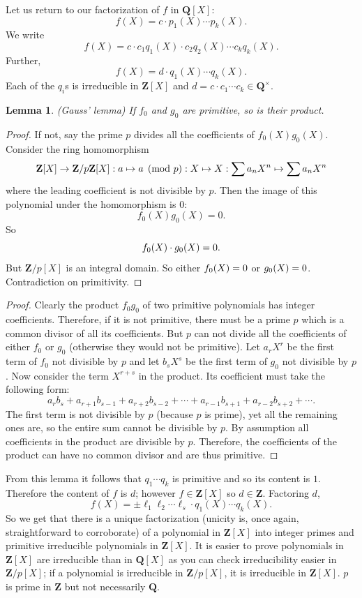 \documentclass[11pt, oneside]{amsart}
\numberwithin{equation}{section}
\numberwithin{theorem}{section}
\newtheorem{lemma}[theorem]{Lemma}
\theoremstyle{definition}
\let\bar\relax
\def\Z{\mathbf{Z}}
\def\Q{\mathbf{Q}}
\begin{document}
{Let us return to our factorization of $f$ in $\Q[X]$:
$$
f(X) = c\cdot p_1(X)\cdots p_k(X).
$$
We write 
$$
f(X) = c\cdot c_1q_1(X) \cdot c_2q_2(X)\cdots c_kq_k(X).
$$
Further,
$$
f(X) = d\cdot q_1(X)\cdots q_k(X).
$$
Each of the $q_i$s is irreducible in $\Z[X]$ and $d = c\cdot c_1\cdots c_k\in\Q^\times$.
\begin{lemma}
(Gauss' lemma) If $f_0$ and $g_0$ are primitive, so is their product.
\end{lemma}
\begin{proof}
If not, say the prime $p$ divides all the coefficients of $f_0(X)g_0(X)$. Consider the ring homomorphism
$$
\Z[X] \to \Z/p\Z[X] : a\mapsto a \pmod p : X\mapsto X : \sum a_nX^n \mapsto \sum \bar{ a_n} X^n
$$
where the leading coefficient is not divisible by $p$. Then the image of this polynomial under the homomorphism is $0$:
$$
f_0(X)g_0(X) = 0.
$$
So
$$
\bar{f_0(X)}\cdot\bar{g_0(X)} = 0.
$$
But $\Z/p[X]$ is an integral domain. So either $\bar{f_0(X)} = 0$ or $\bar{g_0(X)}=0$. Contradiction on primitivity. 
\end{proof}
\begin{proof} %
Clearly the product $f_0 g_0$ of two primitive polynomials has integer coefficients. Therefore, if it is not primitive, there must be a prime $p$ which is a common divisor of all its coefficients. But $p$ can not divide all the coefficients of either $f_0$ or $g_0$ (otherwise they would not be primitive). Let $a_rX^r$ be the first term of $f_0$ not divisible by $p$ and let $b_sX^s$ be the first term of $g_0$ not divisible by $p$. Now consider the term $X^{r + s}$ in the product. Its coefficient must take the following form:
$$
a_{r}b_{s}+a_{r+1}b_{s-1}+a_{r+2}b_{s-2}+\cdots +a_{r-1}b_{s+1}+a_{r-2}b_{s+2}+\cdots.
$$
The first term is not divisible by $p$ (because $p$ is prime), yet all the remaining ones are, so the entire sum cannot be divisible by $p$. By assumption all coefficients in the product are divisible by $p$. Therefore, the coefficients of the product can have no common divisor and are thus primitive.
\end{proof}
From this lemma it follows that $q_1\cdots q_k$ is primitive and so its content is $1$. Therefore the content of $f$ is $d$; however $f\in\Z[X]$ so $d\in\Z$. Factoring $d$,
$$
f(X) = \pm \ell_1\ell_2\cdots \ell_s \cdot q_1(X)\cdots q_k(X).
$$
So we get that there is a unique factorization (unicity is, once again, straightforward to corroborate) of a polynomial in $\Z[X]$ into integer primes and primitive irreducible polynomials in $\Z[X]$. It is easier to prove polynomials in $\Z[X]$ are irreducible than in $\Q[X]$ as you can check irreducibility easier in $\Z/p[X]$; if a polynomial is irreducible in $\Z/p[X]$, it is irreducible in $\Z[X]$. $p$ is prime in $\Z$ but not necessarily $\Q$.

}
\end{document}
